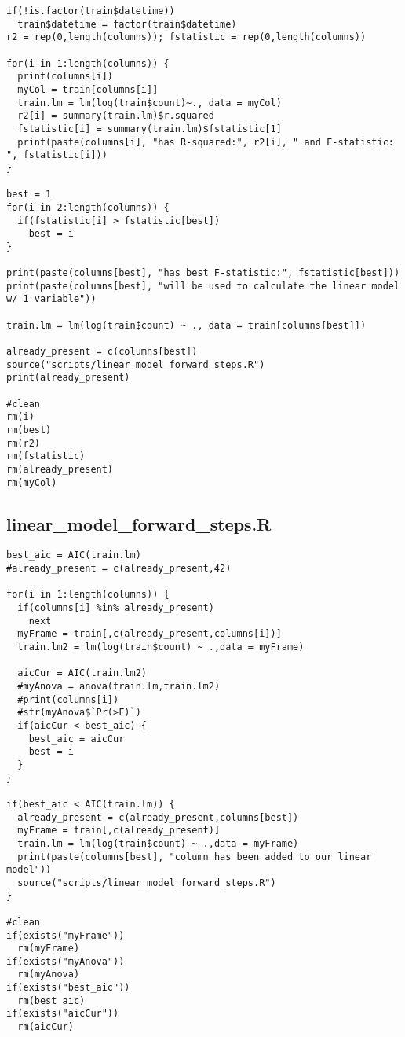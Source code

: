 \begin{verbatim}
if(!is.factor(train$datetime))
  train$datetime = factor(train$datetime)
r2 = rep(0,length(columns)); fstatistic = rep(0,length(columns))

for(i in 1:length(columns)) {
  print(columns[i])
  myCol = train[columns[i]]
  train.lm = lm(log(train$count)~., data = myCol)
  r2[i] = summary(train.lm)$r.squared
  fstatistic[i] = summary(train.lm)$fstatistic[1]
  print(paste(columns[i], "has R-squared:", r2[i], " and F-statistic: ", fstatistic[i]))
}

best = 1
for(i in 2:length(columns)) {
  if(fstatistic[i] > fstatistic[best])
    best = i
}

print(paste(columns[best], "has best F-statistic:", fstatistic[best]))
print(paste(columns[best], "will be used to calculate the linear model w/ 1 variable"))

train.lm = lm(log(train$count) ~ ., data = train[columns[best]])

already_present = c(columns[best])
source("scripts/linear_model_forward_steps.R")
print(already_present)

#clean
rm(i)
rm(best)
rm(r2)
rm(fstatistic)
rm(already_present)
rm(myCol)
\end{verbatim}

\subsection{linear\_model\_forward\_steps.R}
\label{sec:script-linear-model-fwd-steps}

\begin{verbatim}
best_aic = AIC(train.lm)
#already_present = c(already_present,42)

for(i in 1:length(columns)) {
  if(columns[i] %in% already_present)
    next
  myFrame = train[,c(already_present,columns[i])]
  train.lm2 = lm(log(train$count) ~ .,data = myFrame)
  
  aicCur = AIC(train.lm2)
  #myAnova = anova(train.lm,train.lm2)
  #print(columns[i])
  #str(myAnova$`Pr(>F)`)
  if(aicCur < best_aic) {
    best_aic = aicCur
    best = i
  }
}

if(best_aic < AIC(train.lm)) {
  already_present = c(already_present,columns[best])
  myFrame = train[,c(already_present)]
  train.lm = lm(log(train$count) ~ .,data = myFrame)
  print(paste(columns[best], "column has been added to our linear model"))
  source("scripts/linear_model_forward_steps.R")
}

#clean
if(exists("myFrame"))
  rm(myFrame)
if(exists("myAnova"))
  rm(myAnova)
if(exists("best_aic"))
  rm(best_aic)
if(exists("aicCur"))
  rm(aicCur)
\end{verbatim}

